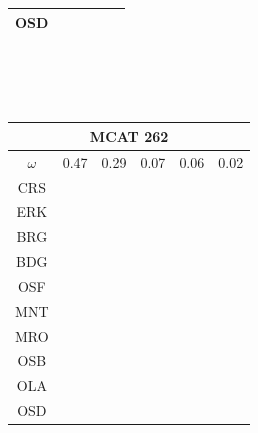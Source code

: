 \documentclass[12pt]{article}
\begin{document}
\begin{landscape}
\begin{figure}
{\begin{minipage}[c]{0.3\textwidth}
\begin{tabular}{|c|c|c|c|c|c|}
        OSD&\cellcolor[HTML]{FFFF33}&\cellcolor[HTML]{984EA3}&\cellcolor[HTML]{FF7F00}&\cellcolor[HTML]{FF7F00}&\cellcolor[HTML]{FF7F00} \\ \hline
\end{tabular}\\$~$\\$~$\\
\hspace*{-5cm}
\begin{tabular}{|c|c|c|c|c|c|}
         \hline \multicolumn{6}{|c|}{MCAT 262} \\ \hline
         $\omega$&0.47&0.29&0.07&0.06&0.02 \\ \hline
        CRS&\cellcolor[HTML]{E41A1C}&\cellcolor[HTML]{E41A1C}&\cellcolor[HTML]{E41A1C}&\cellcolor[HTML]{E41A1C}&\cellcolor[HTML]{E41A1C} \\ \hline
        ERK&\cellcolor[HTML]{E41A1C}&\cellcolor[HTML]{E41A1C}&\cellcolor[HTML]{E41A1C}&\cellcolor[HTML]{E41A1C}&\cellcolor[HTML]{E41A1C} \\ \hline
        BRG&\cellcolor[HTML]{E41A1C}&\cellcolor[HTML]{E41A1C}&\cellcolor[HTML]{377EB8}&\cellcolor[HTML]{E41A1C}&\cellcolor[HTML]{E41A1C} \\ \hline
        BDG&\cellcolor[HTML]{377EB8}&\cellcolor[HTML]{377EB8}&\cellcolor[HTML]{377EB8}&\cellcolor[HTML]{377EB8}&\cellcolor[HTML]{377EB8} \\ \hline
        OSF&\cellcolor[HTML]{377EB8}&\cellcolor[HTML]{377EB8}&\cellcolor[HTML]{377EB8}&\cellcolor[HTML]{377EB8}&\cellcolor[HTML]{4DAF4A} \\ \hline
        MNT&\cellcolor[HTML]{4DAF4A}&\cellcolor[HTML]{4DAF4A}&\cellcolor[HTML]{4DAF4A}&\cellcolor[HTML]{377EB8}&\cellcolor[HTML]{4DAF4A} \\ \hline
        MRO&\cellcolor[HTML]{4DAF4A}&\cellcolor[HTML]{4DAF4A}&\cellcolor[HTML]{4DAF4A}&\cellcolor[HTML]{4DAF4A}&\cellcolor[HTML]{4DAF4A} \\ \hline
        OSB&\cellcolor[HTML]{4DAF4A}&\cellcolor[HTML]{4DAF4A}&\cellcolor[HTML]{4DAF4A}&\cellcolor[HTML]{4DAF4A}&\cellcolor[HTML]{984EA3} \\ \hline
        OLA&\cellcolor[HTML]{984EA3}&\cellcolor[HTML]{984EA3}&\cellcolor[HTML]{984EA3}&\cellcolor[HTML]{984EA3}&\cellcolor[HTML]{984EA3} \\ \hline
        OSD&\cellcolor[HTML]{984EA3}&\cellcolor[HTML]{FF7F00}&\cellcolor[HTML]{984EA3}&\cellcolor[HTML]{FF7F00}&\cellcolor[HTML]{984EA3} \\ \hline
\end{tabular}

\end{minipage}}
\end{figure}
\end{landscape}
\end{document}
